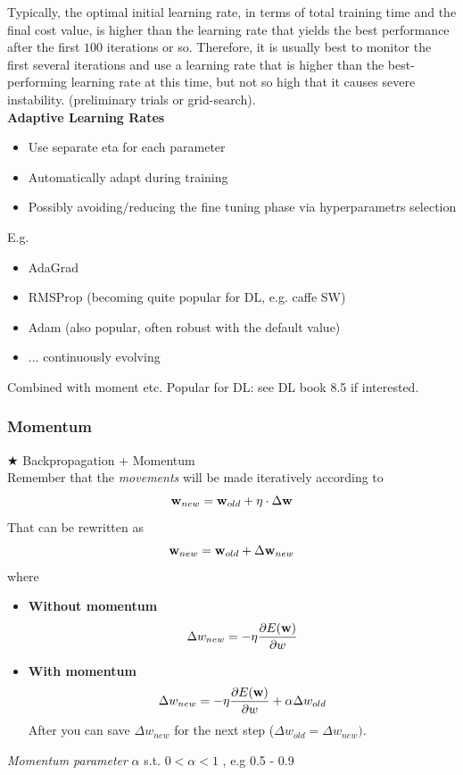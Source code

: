 \documentclass[../main.tex]{subfiles}
\begin{document}
Typically, the optimal initial learning rate, in terms of total training time and the final cost value, is higher than the learning rate that yields the best performance after the first $100$ iterations or so. Therefore, it is usually best to monitor the first several iterations and use a learning rate that is higher than the best-performing learning rate at this time, but not so high that it causes severe instability. (preliminary trials or grid-search).\\

\newpage
\noindent \textbf{Adaptive Learning Rates}
\begin{itemize}
    \item Use separate eta for each parameter
    \item Automatically adapt during training
    \item Possibly avoiding/reducing the fine tuning phase via hyperparametrs selection
\end{itemize}
E.g.
\begin{itemize}
    \item AdaGrad
    \item RMSProp (becoming quite popular for DL, e.g. caffe SW)
    \item Adam (also popular, often robust with the default value)
    \item ... continuously evolving
\end{itemize}
Combined with moment etc. Popular for DL: see DL book 8.5 if interested.

\subsubsection{Momentum}
$\bigstar$ Backpropagation + Momentum\\

\noindent Remember that the \emph{movements} will be made iteratively according to
$$\bold{w}_{new} = \bold{w}_{old} + \eta \cdot \Delta \bold{w}$$
That can be rewritten as
$$\bold{w}_{new} = \bold{w}_{old} + \Delta \bold{w}_{new}$$
where
\begin{itemize}
    \item \textbf{Without momentum}
    $$\Delta w_{new}=-\eta\frac{\partial E(\bold{w})}{\partial w}$$
    \item \textbf{With momentum}
    $$\Delta w_{new}=-\eta \frac{\partial E(\bold{w})}{\partial w} + \alpha \Delta w_{old}$$
    After you can save $\Delta w_{new}$ for the next step ($\Delta w_{old} = \Delta w_{new})$.
\end{itemize}
\noindent\emph{Momentum parameter} $\alpha$ s.t. $0 < \alpha < 1$ , e.g 0.5 - 0.9
\end{document}

